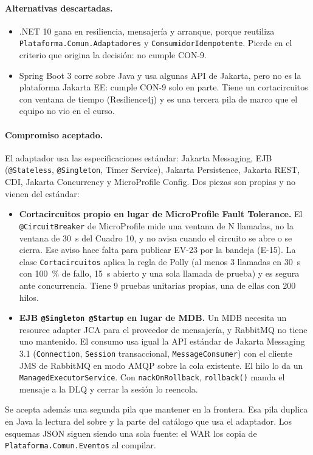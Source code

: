 \paragraph{Alternativas descartadas.}
\begin{itemize}
  \item .NET 10 gana en resiliencia, mensajería y arranque, porque reutiliza \texttt{Plataforma.\br{}Comun.\br{}Adaptadores} y \texttt{ConsumidorIdempotente}. Pierde en el criterio que origina la decisión: no cumple CON-9.
  \item Spring Boot 3 corre sobre Java y usa algunas API de Jakarta, pero no es la plataforma Jakarta EE: cumple CON-9 solo en parte. Tiene un cortacircuitos con ventana de tiempo (Resilience4j) y es una tercera pila de marco que el equipo no vio en el curso.
\end{itemize}

\paragraph{Compromiso aceptado.} El adaptador usa las especificaciones estándar: Jakarta Messaging, EJB (\texttt{@Stateless}, \texttt{@Singleton}, Timer Service), Jakarta Persistence, Jakarta REST, CDI, Jakarta Concurrency y MicroProfile Config.
Dos piezas son propias y no vienen del estándar:
\begin{itemize}
  \item \textbf{Cortacircuitos propio en lugar de MicroProfile Fault Tolerance.} El \texttt{@CircuitBreaker} de MicroProfile mide una ventana de N llamadas, no la ventana de \qty{30}{\second} del Cuadro 10, y no avisa cuando el circuito se abre o se cierra. Ese aviso hace falta para publicar EV-23 por la bandeja (E-15). La clase \texttt{Cortacircuitos} aplica la regla de Polly (al menos 3 llamadas en \qty{30}{\second} con \qty{100}{\percent} de fallo, \qty{15}{\second} abierto y una sola llamada de prueba) y es segura ante concurrencia. Tiene 9 pruebas unitarias propias, una de ellas con 200 hilos.
  \item \textbf{EJB \texttt{@Singleton @Startup} en lugar de MDB.} Un MDB necesita un resource adapter JCA para el proveedor de mensajería, y RabbitMQ no tiene uno mantenido. El consumo usa igual la API estándar de Jakarta Messaging 3.1 (\texttt{Connection}, \texttt{Session} transaccional, \texttt{MessageConsumer}) con el cliente JMS de RabbitMQ en modo AMQP sobre la cola existente. El hilo lo da un \texttt{ManagedExecutorService}. Con \texttt{nackOnRollback}, \texttt{rollback()} manda el mensaje a la DLQ y cerrar la sesión lo reencola.
\end{itemize}
Se acepta además una segunda pila que mantener en la frontera. Esa pila duplica en Java la lectura del sobre y la parte del catálogo que usa el adaptador. Los esquemas JSON siguen siendo una sola fuente: el WAR los copia de \texttt{Plataforma.\br{}Comun.\br{}Eventos} al compilar.

